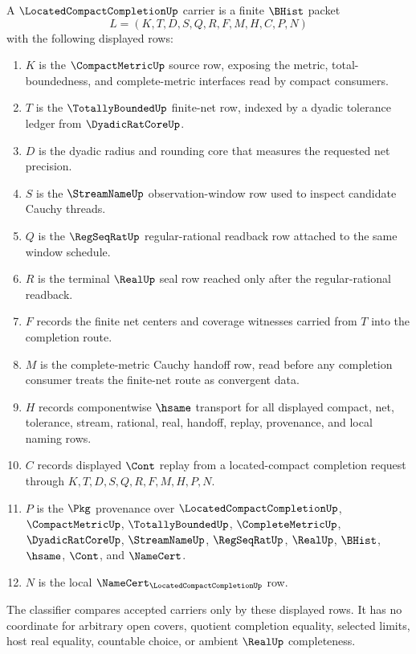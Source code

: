 \begin{definition}
\label{def:located-compact-completion-carrier}
A $\LocatedCompactCompletionUp$ carrier is a finite $\BHist$ packet
$$
L=(K,T,D,S,Q,R,F,M,H,C,P,N)
$$
with the following displayed rows:
\begin{enumerate}
\item $K$ is the $\CompactMetricUp$ source row, exposing the metric, total-boundedness, and complete-metric interfaces read by compact consumers.
\item $T$ is the $\TotallyBoundedUp$ finite-net row, indexed by a dyadic tolerance ledger from $\DyadicRatCoreUp$.
\item $D$ is the dyadic radius and rounding core that measures the requested net precision.
\item $S$ is the $\StreamNameUp$ observation-window row used to inspect candidate Cauchy threads.
\item $Q$ is the $\RegSeqRatUp$ regular-rational readback row attached to the same window schedule.
\item $R$ is the terminal $\RealUp$ seal row reached only after the regular-rational readback.
\item $F$ records the finite net centers and coverage witnesses carried from $T$ into the completion route.
\item $M$ is the complete-metric Cauchy handoff row, read before any completion consumer treats the finite-net route as convergent data.
\item $H$ records componentwise $\hsame$ transport for all displayed compact, net, tolerance, stream, rational, real, handoff, replay, provenance, and local naming rows.
\item $C$ records displayed $\Cont$ replay from a located-compact completion request through $K,T,D,S,Q,R,F,M,H,P,N$.
\item $P$ is the $\Pkg$ provenance over $\LocatedCompactCompletionUp$, $\CompactMetricUp$, $\TotallyBoundedUp$, $\CompleteMetricUp$, $\DyadicRatCoreUp$, $\StreamNameUp$, $\RegSeqRatUp$, $\RealUp$, $\BHist$, $\hsame$, $\Cont$, and $\NameCert$.
\item $N$ is the local $\NameCert_{\LocatedCompactCompletionUp}$ row.
\end{enumerate}
The classifier compares accepted carriers only by these displayed rows. It has no coordinate for arbitrary open covers, quotient completion equality, selected limits, host real equality, countable choice, or ambient $\RealUp$ completeness.
\end{definition}

